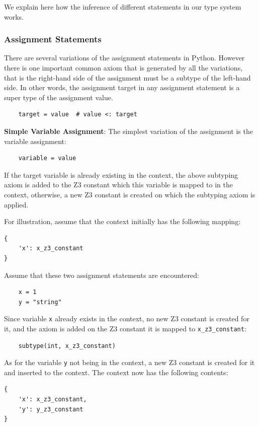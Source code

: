 We explain here how the inference of different statements in our type system works.

\subsubsection{Assignment Statements}
There are several variations of the assignment statements in Python. However there is one important common axiom that is generated by all the variations, that is the right-hand side of the assignment must be a subtype of the left-hand side. In other words, the assignment target in any assignment statement is a super type of the assignment value.

\begin{lstlisting}
	target = value  # value <: target
\end{lstlisting}


\textbf{Simple Variable Assignment}: The simplest variation of the assignment is the variable assignment:
\begin{lstlisting}
	variable = value
\end{lstlisting}

If the target variable is already existing in the context, the above subtyping axiom is added to the Z3 constant which this variable is mapped to in the context, otherwise, a new Z3 constant is created on which the subtyping axiom is applied.

For illustration, assume that the context initially has the following mapping:
\begin{lstlisting}
{
	'x': x_z3_constant
}
\end{lstlisting}

Assume that these two assignment statements are encountered:
\begin{lstlisting}
	x = 1
	y = "string"
\end{lstlisting}

Since variable \lstinline|x| already exists in the context, no new Z3 constant is created for it, and the axiom is added on the Z3 constant it is mapped to \lstinline|x_z3_constant|:
\begin{lstlisting}
	subtype(int, x_z3_constant)
\end{lstlisting}

As for the variable \lstinline|y| not being in the context, a new Z3 constant is created for it and inserted to the context. The context now has the following contents:
\begin{lstlisting}
{
	'x': x_z3_constant,
	'y': y_z3_constant
}
\end{lstlisting}

